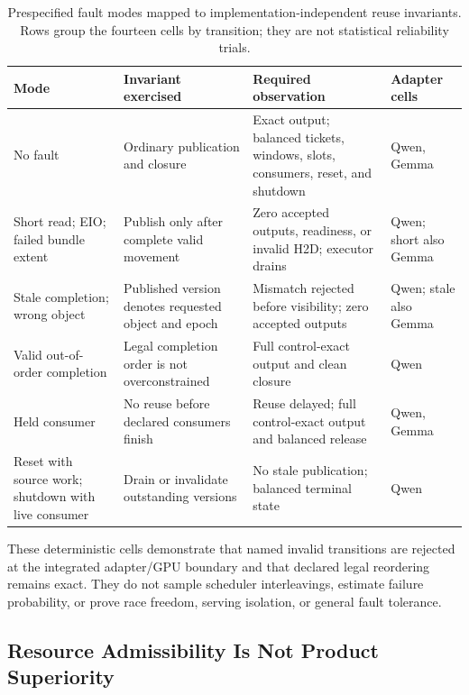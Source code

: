\documentclass[letterpaper,twocolumn,10pt]{article}
\begin{document}
\begin{table}[t]
  \centering
  \scriptsize
  \caption{Prespecified fault modes mapped to implementation-independent reuse
  invariants.  Rows group the fourteen cells by transition; they are not
  statistical reliability trials.}
  \label{tab:faultmatrix}
  \begin{tabularx}{\textwidth}{@{}p{3.2cm}p{4.1cm}p{4.5cm}X@{}}
    \toprule
    Mode & Invariant exercised & Required observation & Adapter cells \\
    \midrule
    No fault & Ordinary publication and closure & Exact output; balanced
      tickets, windows, slots, consumers, reset, and shutdown & Qwen, Gemma \\
    Short read; EIO; failed bundle extent & Publish only after complete valid
      movement & Zero accepted outputs, readiness, or invalid H2D; executor
      drains & Qwen; short also Gemma \\
    Stale completion; wrong object & Published version denotes requested
      object and epoch & Mismatch rejected before visibility; zero accepted
      outputs & Qwen; stale also Gemma \\
    Valid out-of-order completion & Legal completion order is not overconstrained
      & Full control-exact output and clean closure & Qwen \\
    Held consumer & No reuse before declared consumers finish & Reuse delayed;
      full control-exact output and balanced release & Qwen, Gemma \\
    Reset with source work; shutdown with live consumer & Drain or invalidate
      outstanding versions & No stale publication; balanced terminal state &
      Qwen \\
    \bottomrule
  \end{tabularx}
\end{table}

These deterministic cells demonstrate that named invalid transitions are
rejected at the integrated adapter/GPU boundary and that declared legal
reordering remains exact.  They do not sample scheduler interleavings, estimate
failure probability, or prove race freedom, serving isolation, or general
fault tolerance.

\boundedtransfer

\subsection{Resource Admissibility Is Not Product Superiority}
\end{document}
